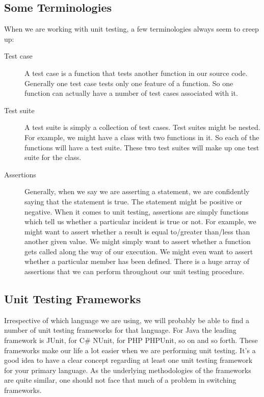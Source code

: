 \documentclass{article}
\begin{document}
\subsection{Some Terminologies}
When we are working with unit testing, a few terminologies always seem to creep up:
\begin{description}
\item[Test case] A test case is a function that tests another function in our source code.
Generally one test case tests only one feature of a function. 
So one function can actually have a number of test cases associated with it.
\item[Test suite] A test suite is simply a collection of test cases. Test suites might be nested. 
For example, we might have a class with two functions in it.
So each of the functions will have a test suite.
These two test suites will make up one test suite for the class.
\item[Assertions] Generally, when we say we are asserting a statement, we are confidently saying that the statement is true.
The statement might be positive or negative.
When it comes to unit testing, assertions are simply functions which tell us whether a particular incident is true or not.
For example, we might want to assert whether a result is equal to/greater than/less than another given value.
We might simply want to assert whether a function gets called along the way of our execution.
We might even want to assert whether a particular member has been defined.
There is a huge array of assertions that we can perform throughout our unit testing procedure.

\end{description}

\subsection{Unit Testing Frameworks}
Irrespective of which language we are using, 
we will probably be able to find a number of unit testing frameworks for that language.
For Java the leading framework is JUnit, for C\# NUnit, for PHP PHPUnit, so on and so forth.
These frameworks make our life a lot easier when we are performing unit testing.
It's a good idea to have a clear concept regarding at least one unit testing framework for your primary language.
As the underlying methodologies of the frameworks are quite similar, one should not face that much of a problem in switching frameworks.
\end{document}

